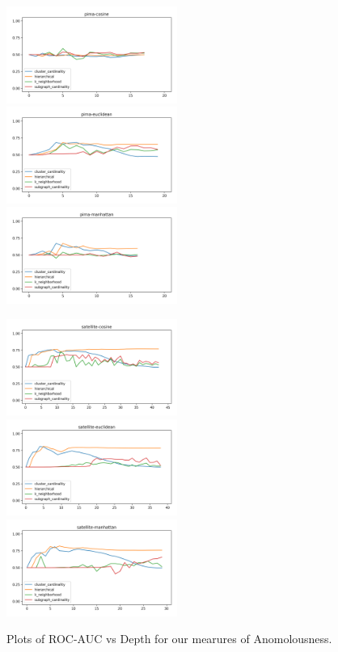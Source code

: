 \begin{figure}[!t]
\includegraphics[width=2.2in]{kdd/static/auc_vs_depth/pima-cosine.png}
\includegraphics[width=2.2in]{kdd/static/auc_vs_depth/pima-euclidean.png}
\includegraphics[width=2.2in]{kdd/static/auc_vs_depth/pima-manhattan.png}

\includegraphics[width=2.2in]{kdd/static/auc_vs_depth/satellite-cosine.png}
\includegraphics[width=2.2in]{kdd/static/auc_vs_depth/satellite-euclidean.png}
\includegraphics[width=2.2in]{kdd/static/auc_vs_depth/satellite-manhattan.png}

\caption{
Plots of ROC-AUC vs Depth for our mearures of Anomolousness.
}

\label{results:datasets_2}
\end{figure}

